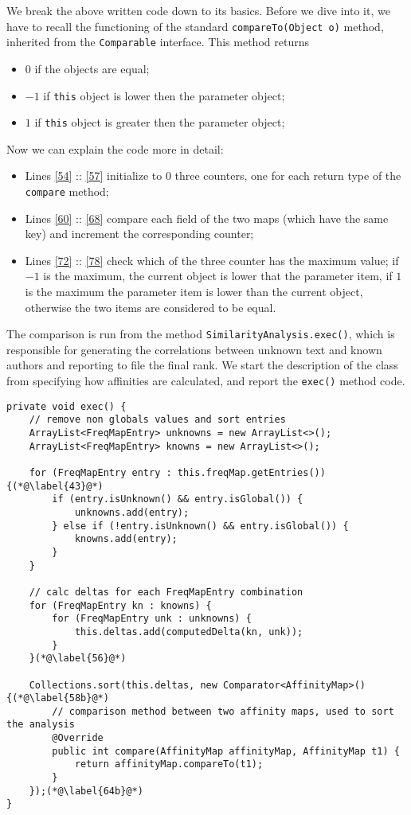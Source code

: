 \documentclass[a4paper,11pt, twoside]{article}
\begin{document}
	 \noindent
	We break the above written code down to its basics. Before we dive into it, we have to recall the functioning of the standard \lstinline|compareTo(Object o)| method, inherited from the \lstinline|Comparable| interface. This method returns \begin{itemize}
		\item $0$ if the objects are equal;
	 	\item $-1$ if \lstinline|this| object is lower then the parameter object;
	 	\item $1$ if \lstinline|this| object is greater then the parameter object;
	\end{itemize}
 
	\noindent
	 Now we can explain the code more in detail: 
	\begin{itemize}
 		\item Lines \ref{54} :: \ref{57} initialize to 0 three counters, one for each return type of the \lstinline|compare| method;
 		\item Lines \ref{60} :: \ref{68} compare each field of the two maps (which have the same key) and increment the corresponding counter;
 		\item Lines \ref{72} :: \ref{78} check which of the three counter has the maximum value; if $-1$ is the maximum, the current object is lower that the parameter item, if $1$ is the maximum the parameter item is lower than the current object, otherwise the two items are considered to be equal.
 	\end{itemize}
 	The comparison is run from the method \lstinline|SimilarityAnalysis.exec()|, which is responsible for generating the correlations between unknown text and known authors and reporting to file the final rank. We start the description of the class from specifying how affinities are calculated, and report the \lstinline|exec()| method code.
 	
 	\begin{lstlisting}[firstnumber=38]
private void exec() {
	// remove non globals values and sort entries
	ArrayList<FreqMapEntry> unknowns = new ArrayList<>();
	ArrayList<FreqMapEntry> knowns = new ArrayList<>();
	
	for (FreqMapEntry entry : this.freqMap.getEntries()) {(*@\label{43}@*)
		if (entry.isUnknown() && entry.isGlobal()) {
			unknowns.add(entry);
		} else if (!entry.isUnknown() && entry.isGlobal()) {
			knowns.add(entry);
		}
	}
	
	// calc deltas for each FreqMapEntry combination
	for (FreqMapEntry kn : knowns) {
		for (FreqMapEntry unk : unknowns) {
			this.deltas.add(computedDelta(kn, unk));
		}
	}(*@\label{56}@*)
	
	Collections.sort(this.deltas, new Comparator<AffinityMap>() {(*@\label{58b}@*)
		// comparison method between two affinity maps, used to sort the analysis
		@Override
		public int compare(AffinityMap affinityMap, AffinityMap t1) {
			return affinityMap.compareTo(t1);
		}
	});(*@\label{64b}@*)
}
 	\end{lstlisting}
 	
\end{document}
